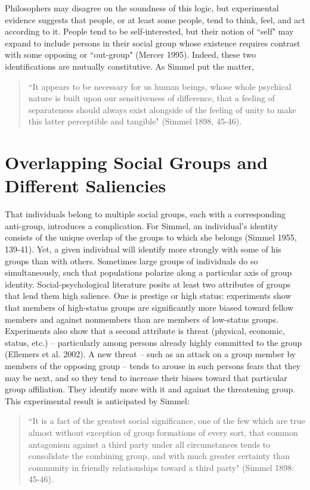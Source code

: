 \documentclass[12pt]{article}
\begin{document}
Philosophers may disagree on the soundness of this logic, but experimental evidence suggests that people, or at least some people, tend to think, feel, and act according to it.  People tend to be self-interested, but their notion of ``self" may expand to include persons in their social group whose existence requires contrast with some opposing or ``out-group" (Mercer 1995).  Indeed, these two identifications are mutually constitutive.  As Simmel put the matter,
\begin{quotation}
	``It appears to be necessary for us human beings, whose whole psychical nature is built upon our sensitiveness of difference, that a feeling of separateness should always exist alongside of the feeling of unity to make this latter perceptible and tangible" (Simmel 1898, 45-46).  
\end{quotation} 

\section*{Overlapping Social Groups and Different Saliencies}
That individuals belong to multiple social groups, each with a corresponding anti-group, introduces a complication.  For Simmel, an individual's identity consists of the unique overlap of the groups to which she belongs (Simmel 1955, 139-41).  Yet, a given individual will identify more strongly with some of his groups than with others.  
Sometimes large groups of individuals do so simultaneously, such that populations polarize along a particular axis of group identity.   Social-psychological literature posits at least two attributes of groups that lend them high salience.  One is prestige or high status:  experiments show that members of high-status groups are significantly more biased toward fellow members and against nonmembers than are members of low-status groups.   Experiments also show that a second attribute is threat (physical, economic, status, etc.) – particularly among persons already highly committed to the group (Ellemers et al. 2002).  A new threat – such as an attack on a group member by members of the opposing group – tends to arouse in such persons fears that they may be next, and so they tend to increase their biases toward that particular group affiliation.  They identify more with it and against the threatening group.  This experimental result is anticipated by Simmel:

\begin{quotation}
	``It is a fact of the greatest social significance, one of the few which are true almost without exception of group formations of every sort, that common antagonism against a third party under all circumstances tends to consolidate the combining group, and with much greater certainty than community in friendly relationships toward a third party" (Simmel 1898: 45-46).
\end{quotation}
\end{document}
